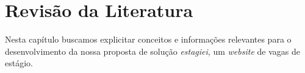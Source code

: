 \chapter{Revisão da Literatura}
Nesta capítulo buscamos explicitar conceitos e informações relevantes para o desenvolvimento da nossa proposta de solução \emph{estagiei}, um \emph{website} de vagas de estágio.
\begin{comment}
Todos trabalhos devem possuir a revisão de literatura onde são abordados os estudos feitos com base da literatura (livros, artigos acadêmicos, publicações em periódicos), todos elementos devem ser referenciados por citações.

Diversas referencias utilizadas nesse modelo não deveriam ser utilizadas diretamente em um trabalho acadêmico, mas estão aqui para demonstrar de forma mais clara alguns pontos importantes sobre desenvolvimento de projetos

Cada parágrafo da revisão de literatura deve apresentar uma ideia com base em uma referencia 

Copiar e colocar é plágio. Exceto em casos muito específicos onde utilizamos a citação direta você deve escrever com suas palavras (seu entendimento, parafrasear) o que os autores escreveram na publicação original

Não são abordados aqui itens técnicos que normalmente são vistos em disciplinas anteriores do curso (UML, banco de dados, metodologias de gerenciamento de projeto etc...), esses elementos podem receber citações nos outros capítulos do trabalho. Essa regra não se aplica aos trabalhos de pós graduação quando o tema estiver relacionado a conceitos técnicos.

\end{comment}








